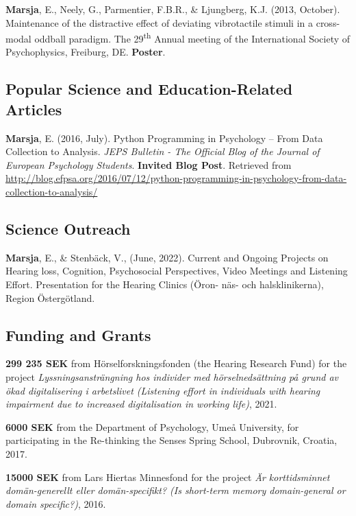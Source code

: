 \documentclass[]{article}
\begin{document}
\textbf{Marsja}, E., Neely, G., Parmentier, F.B.R., \& Ljungberg, K.J.
(2013, October). Maintenance of the distractive effect of deviating
vibrotactile stimuli in a cross-modal oddball paradigm. The
29\textsuperscript{th} Annual meeting of the International Society of
Psychophysics, Freiburg, DE. \textbf{Poster}.

\hypertarget{popular-science-and-education-related-articles}{%
\subsection{Popular Science and Education-Related
Articles}\label{popular-science-and-education-related-articles}}

\textbf{Marsja}, E. (2016, July). Python Programming in Psychology --
From Data Collection to Analysis. \emph{JEPS Bulletin - The Official
Blog of the Journal of European Psychology Students}. \textbf{Invited
Blog Post}. Retrieved from \sloppy
\url{http://blog.efpsa.org/2016/07/12/python-programming-in-psychology-from-data-collection-to-analysis/}

\hypertarget{science-outreach}{%
\subsection{Science Outreach}\label{science-outreach}}

\textbf{Marsja}, E., \& Stenbäck, V., (June, 2022). Current and Ongoing
Projects on Hearing loss, Cognition, Psychosocial Perspectives, Video
Meetings and Listening Effort. Presentation for the Hearing Clinics
(Öron- näs- och halsklinikerna), Region Östergötland.

\hypertarget{funding-and-grants}{%
\subsection{Funding and Grants}\label{funding-and-grants}}

\textbf{299 235 SEK} from Hörselforskningsfonden (the Hearing Research
Fund) for the project \emph{Lyssningsansträngning hos individer med
hörselnedsättning på grund av ökad digitalisering i arbetslivet
(Listening effort in individuals with hearing impairment due to
increased digitalisation in working life)}, 2021.

\textbf{6000 SEK} from the Department of Psychology, Umeå University,
for participating in the Re-thinking the Senses Spring School,
Dubrovnik, Croatia, 2017.

\textbf{15000 SEK} from Lars Hiertas Minnesfond for the project \emph{Är
korttidsminnet domän-generellt eller domän-specifikt? (Is short-term
memory domain-general or domain specific?)}, 2016.
\end{document}
